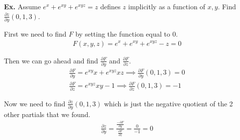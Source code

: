 \documentclass[12pt,letterpaper]{article} \usepackage{amsmath} \usepackage{graphicx}  \usepackage{longtable}  \usepackage{amssymb}
\begin{document}
        \begin{mdframed}
            \textbf{Ex. } Assume $e^x + e^{xy} + e^{xyz} = z$ defines $z$ implicitly as a function of $x,y$. Find $\frac{\partial z}{\partial y} (0,1,3)$.

            First we need to find $F$ by setting the function equal to 0.
            \begin{align*}
                F(x,y,z) = e^x + e^{xy} + e^{xyz} -z = 0
            \end{align*}

            Then we can go ahead and find $\frac{\partial F}{\partial y}$ and $\frac{\partial F}{\partial z}$. 
            \begin{align*}
                \frac{\partial F}{\partial y} = e^{xy}x + e^{xyz}xz \implies \frac{\partial F}{\partial y} (0,1,3) = 0\\
                \frac{\partial F}{\partial z} = e^{xyz}xy-1 \implies \frac{\partial F}{\partial z} (0,1,3) = -1
            \end{align*}

            Now we need to find $\frac{\partial z}{\partial y} (0,1,3)$ which is just the negative quotient of the 2 other partials that we found. 
            \begin{align*}
                \frac{\partial z}{\partial y} = \frac{\frac{-\partial F}{\partial y}}{\frac{\partial F}{\partial z}} = \frac{0}{-1} = 0
            \end{align*}
        \end{mdframed}

        

        
\end{document}

